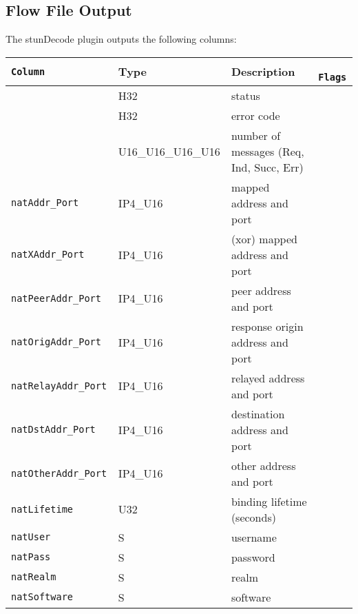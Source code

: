\documentclass[documentation]{subfiles}
\begin{document}
\subsection{Flow File Output}
The stunDecode plugin outputs the following columns:
\begin{longtable}{>{\tt}lll>{\tt\small}l}
    \toprule
    {\bf Column}                 & {\bf Type}         & {\bf Description} & {\bf Flags}\\
    \midrule\endhead%
    \nameref{natStat}            & H32                & status                                   & \\
    \nameref{natErr}             & H32                & error code                               & \\
    \nameref{natMCReqIndSuccErr} & U16\_U16\_U16\_U16 & number of messages (Req, Ind, Succ, Err) & \\
    natAddr\_Port                & IP4\_U16           & mapped address and port                  & \\
    natXAddr\_Port               & IP4\_U16           & (xor) mapped address and port            & \\
    natPeerAddr\_Port            & IP4\_U16           & peer address and port                    & \\
    natOrigAddr\_Port            & IP4\_U16           & response origin address and port         & \\
    natRelayAddr\_Port           & IP4\_U16           & relayed address and port                 & \\
    natDstAddr\_Port             & IP4\_U16           & destination address and port             & \\
    natOtherAddr\_Port           & IP4\_U16           & other address and port                   & \\
    natLifetime                  & U32                & binding lifetime (seconds)               & \\
    natUser                      & S                  & username                                 & \\
    natPass                      & S                  & password                                 & \\
    natRealm                     & S                  & realm                                    & \\
    natSoftware                  & S                  & software                                 & \\


\end{longtable}
\end{document}
